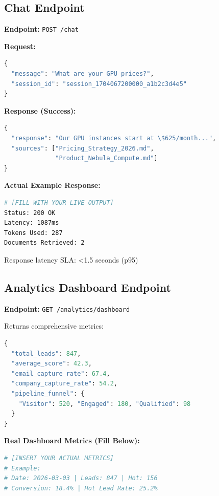 \documentclass[10pt,twocolumn,a4paper]{article}
\begin{document}
\subsection{Chat Endpoint}

\textbf{Endpoint:} \texttt{POST /chat}

\textbf{Request:}
\begin{lstlisting}[language=Python]
{
  "message": "What are your GPU prices?",
  "session_id": "session_1704067200000_a1b2c3d4e5"
}
\end{lstlisting}

\textbf{Response (Success):}
\begin{lstlisting}[language=Python, basicstyle=\ttfamily\tiny]
{
  "response": "Our GPU instances start at \$625/month...",
  "sources": ["Pricing_Strategy_2026.md", 
              "Product_Nebula_Compute.md"]
}
\end{lstlisting}

\textbf{Actual Example Response:}
\begin{lstlisting}[language=bash]
# [FILL WITH YOUR LIVE OUTPUT]
Status: 200 OK
Latency: 1087ms
Tokens Used: 287
Documents Retrieved: 2
\end{lstlisting}

Response latency SLA: <1.5 seconds (p95)

\subsection{Analytics Dashboard Endpoint}

\textbf{Endpoint:} \texttt{GET /analytics/dashboard}

Returns comprehensive metrics:

\begin{lstlisting}[language=Python, basicstyle=\ttfamily\tiny]
{
  "total_leads": 847,
  "average_score": 42.3,
  "email_capture_rate": 67.4,
  "company_capture_rate": 54.2,
  "pipeline_funnel": {
    "Visitor": 520, "Engaged": 180, "Qualified": 98
  }
}
\end{lstlisting}

\textbf{Real Dashboard Metrics (Fill Below):}
\begin{lstlisting}[language=bash]
# [INSERT YOUR ACTUAL METRICS]
# Example:
# Date: 2026-03-03 | Leads: 847 | Hot: 156 
# Conversion: 18.4% | Hot Lead Rate: 25.2%
\end{lstlisting}

\end{document}
